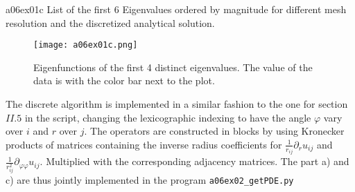 %
\vspace*{2\FigUpperVSpace}
		 {a06ex01c}
		 {List of the first 6 Eigenvalues ordered by magnitude for different mesh resolution and the discretized analytical solution.}
%
\begin{figure}[H]
	\centering
	\texttt{[image: a06ex01c.png]} 
	\caption{Eigenfunctions of the first 4 distinct eigenvalues.
			 The value of the data is with the color bar next to the plot.}
	\label{fig:a06ex01c}
\end{figure}
%

The discrete algorithm is implemented in a similar fashion to the one for section $II.5$ in the script, changing the lexicographic indexing to have the angle $\varphi$ vary over $i$ and $r$ over $j$. The operators are constructed in blocks by using Kronecker products of matrices containing the inverse radius coefficients for $\frac{1}{r_{ij}}\partial_{r}u_{ij}$ and $\frac{1}{r_{ij}^2}\partial_{\varphi\varphi}u_{ij}$. Multiplied with the corresponding adjacency matrices. The part a) and c) are thus jointly implemented in the program \texttt{a06ex02\_getPDE.py}

